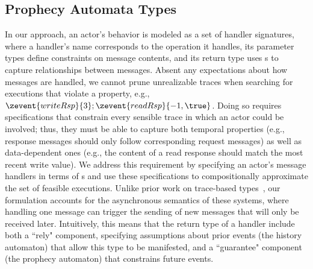 \subsection{Prophecy Automata Types}
In our approach, an actor's behavior is modeled as a set of handler
signatures, where a handler's name corresponds to the operation it
handles, its parameter types define constraints on message contents,
and its return type uses \PAT{}s to capture relationships between
messages. Absent any expectations about how messages are handled, we
cannot prune unrealizable traces when searching for executions that
violate a property, e.g.,
$\zevent{writeRsp}{3};\zevent{readRsp}{-1,\true}$.  Doing so
requires specifications that constrain every sensible trace in which
an actor could be involved; thus, they must be able to capture both
temporal properties (e.g., response messages should only follow
corresponding request messages) as well as data-dependent ones (e.g.,
the content of a read response should match the most recent write
value).
We address this requirement by specifying an actor's message handlers
in terms of \PAT{}s and use these specifications to compositionally
approximate the set of feasible executions.  Unlike prior work on
trace-based types~\cite{KT+14,ZYDJ24,NUKT+18}, our formulation
accounts for the asynchronous semantics of these systems, where
handling one message can trigger the sending of new messages that will
only be received later.  Intuitively, this means that the return type
of a handler include both a ``rely" component, specifying assumptions
about prior events (the history automaton) that allow this type to be
manifested, and a ``guarantee" component (the prophecy automaton) that
constrains future events.


